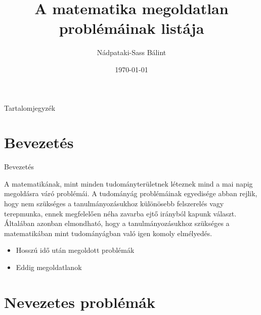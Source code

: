 \documentclass{beamer}
\title{A matematika megoldatlan problémáinak listája}
\author{Nádpataki-Sass Bálint}
\date{\today}
\institute{Miskolci Egyetem}
\theoremstyle{definition}
\begin{document}
\maketitle

\begin{frame}{Tartalomjegyzék}
\tableofcontents
\end{frame}

\section{Bevezetés}

\begin{frame}{Bevezetés}

\transdissolve

    A matematikának, mint minden tudományterületnek léteznek mind a mai napig megoldásra váró problémái. A tudományág problémáinak egyedisége abban rejlik, hogy nem szükséges a tanulmányozásukhoz különösebb felszerelés vagy terepmunka, ennek megfelelően néha zavarba ejtő irányból kapunk választ. Általában azonban elmondható, hogy a tanulmányozásukhoz szükséges a matematikában mint tudományágban való igen komoly elmélyedés.
    \begin{itemize}
        \pause
        \item Hosszú idő után megoldott problémák
        \pause
        \item Eddig megoldatlanok
    \end{itemize}
\end{frame}
\section{Nevezetes problémák}
\end{document}
